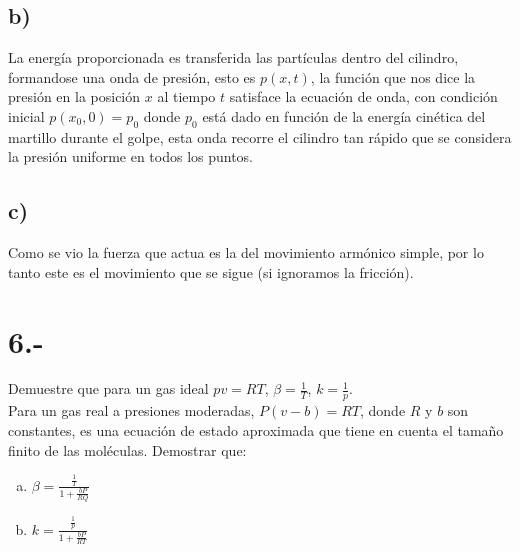 \documentclass{article}
\begin{document}
\begin{tcolorbox}[breakable]
    \subsection*{b)}
    La energía proporcionada es transferida las partículas dentro del cilindro, 
    formandose una onda de presión, esto es $p(x,t)$, la función que nos dice la 
    presión en la posición $x$ al tiempo $t$ satisface la ecuación 
    de onda, con condición inicial $p(x_0,0) = p_0$ donde $p_0$ está dado en 
    función de la energía cinética del martillo durante el golpe, esta onda 
    recorre el cilindro tan rápido que se considera la presión uniforme 
    en todos los puntos. 
    \subsection*{c)}
    Como se vio la fuerza que actua es la del movimiento armónico simple, por lo 
    tanto este es el movimiento que se sigue (si ignoramos la fricción).
    
\end{tcolorbox}
\section*{6.-}
Demuestre que para un gas ideal $pv = RT$, $\beta = \frac{1}{T}$, $k = \frac{1}{p}$. \\
Para un gas real a presiones moderadas, $P(v-b) = RT$, donde $R$ y $b$ son constantes, 
es una ecuación de estado aproximada que tiene en cuenta el tamaño finito de las moléculas.
Demostrar que:
\begin{enumerate}[a)]
    \item $\beta = \frac{\frac{1}{T}}{1+\frac{bP}{RQ}}$
    \item $k = \frac{\frac{1}{p}}{1+\frac{bP}{RT}} $
\end{enumerate}

\begin{tcolorbox}[breakable]
    
\end{tcolorbox}
\end{document}
